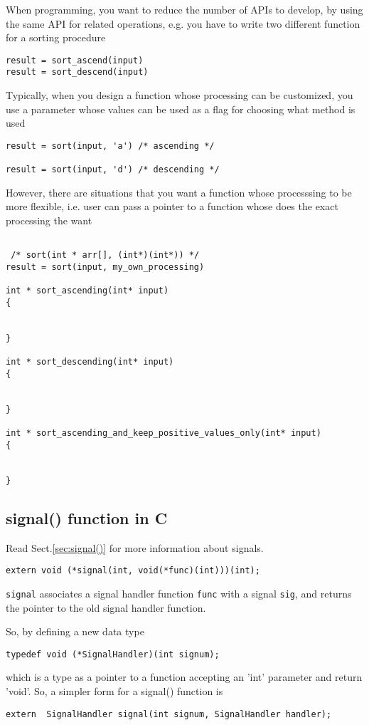When programming, you want to reduce the number of APIs to develop, by using the
same API for related operations, e.g. you have to write two different function
for a sorting procedure
\begin{verbatim}
result = sort_ascend(input)
result = sort_descend(input)
\end{verbatim}

Typically, when you design a function whose processing can be customized, you
use a parameter whose values can be used as a flag for choosing what method is
used
\begin{verbatim}
result = sort(input, 'a') /* ascending */

result = sort(input, 'd') /* descending */
\end{verbatim}

However, there are situations that you want a function whose processsing
to be more flexible, i.e. user can pass a pointer to a function whose does the
exact processing the want
\begin{verbatim}

 /* sort(int * arr[], (int*)(int*)) */
result = sort(input, my_own_processing)

int * sort_ascending(int* input)
{


}

int * sort_descending(int* input)
{


}

int * sort_ascending_and_keep_positive_values_only(int* input)
{


}

\end{verbatim}

\subsection{signal() function in C}
\label{sec:signal}

Read Sect.\ref{sec:signal()} for more information about signals.
\begin{verbatim}
extern void (*signal(int, void(*func)(int)))(int);
\end{verbatim}
\verb!signal! associates a signal handler function \verb!func! with a signal
\verb!sig!, and returns the pointer to the old signal handler function.

So, by defining a new data type
\begin{verbatim}
typedef void (*SignalHandler)(int signum);
\end{verbatim}
which is a type as a pointer to a function accepting an 'int' parameter and
return 'void'. So, a simpler form for a signal() function is
\begin{verbatim}
extern  SignalHandler signal(int signum, SignalHandler handler);
\end{verbatim}

